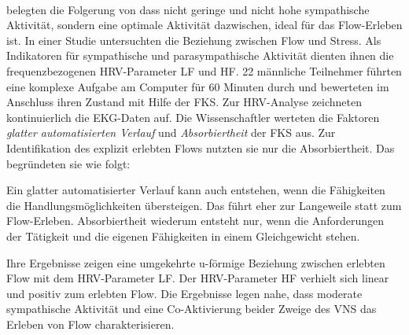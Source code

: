 \paragraph{\citet{Peifer2014}} 

\label{par:peifer2014}

belegten die Folgerung von \citet{deManzano2010, Peifer2012} dass nicht geringe und nicht hohe sympathische Aktivität, sondern eine optimale Aktivität dazwischen, ideal für das Flow-Erleben ist. In einer Studie untersuchten \citet{Peifer2014} die Beziehung zwischen Flow und Stress. Als Indikatoren für sympathische und parasympathische Aktivität dienten ihnen die frequenzbezogenen \ac{HRV}-Parameter \acs{LF} und \acs{HF}. 22 männliche Teilnehmer führten eine komplexe Aufgabe am Computer für 60 Minuten durch und bewerteten im Anschluss ihren Zustand mit Hilfe der \ac{FKS}. Zur \ac{HRV}-Analyse zeichneten \citet{Peifer2014} kontinuierlich die \ac{EKG}-Daten auf. Die Wissenschaftler werteten die Faktoren \emph{glatter automatisierten Verlauf} und \emph{Absorbiertheit} der \ac{FKS} aus. Zur Identifikation des explizit erlebten Flows nutzten sie nur die Absorbiertheit. Das begründeten sie wie folgt:

Ein glatter automatisierter Verlauf kann auch entstehen, wenn die Fähigkeiten die Handlungsmöglichkeiten übersteigen. Das führt eher zur Langeweile statt zum Flow-Erleben. Absorbiertheit wiederum entsteht nur, wenn die Anforderungen der Tätigkeit und die eigenen Fähigkeiten in einem Gleichgewicht stehen.

Ihre Ergebnisse zeigen eine umgekehrte u-förmige Beziehung zwischen erlebten Flow mit dem \ac{HRV}-Parameter \acs{LF}. Der \ac{HRV}-Parameter \acs{HF} verhielt sich linear und positiv zum erlebten Flow. Die Ergebnisse legen nahe, dass moderate sympathische Aktivität und eine Co-Aktivierung beider Zweige des \acs{VNS} das Erleben von Flow charakterisieren.

\paragraph{\citet{Tozman2015}} 

\label{par:tozman2015}

